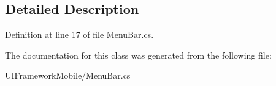 \subsection{Detailed Description}


Definition at line 17 of file MenuBar.cs.

The documentation for this class was generated from the following file:\begin{DoxyCompactItemize}
\item 
UIFrameworkMobile/MenuBar.cs\end{DoxyCompactItemize}
